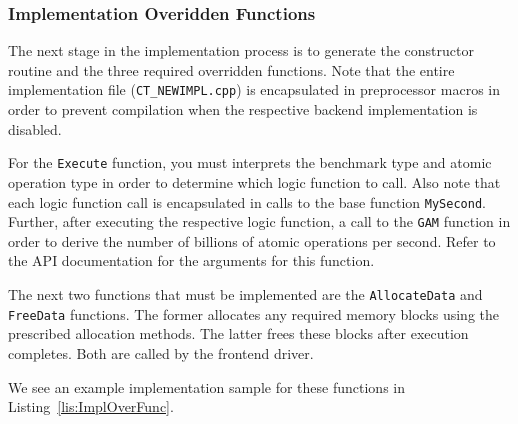 \documentclass{article}
\begin{document}
\clearpage
\subsubsection{Implementation Overidden Functions}

The next stage in the implementation process is to generate the constructor routine 
and the three required overridden functions.  Note that the entire implementation 
file (\texttt{CT\_NEWIMPL.cpp}) is encapsulated in preprocessor macros in order to prevent 
compilation when the respective backend implementation is disabled.  

For the \texttt{Execute} function, you must interprets the benchmark type and atomic operation type 
in order to determine which logic function to call.  Also note that each logic function call is encapsulated 
in calls to the base function \texttt{MySecond}.  Further, after executing the respective logic function, a call 
to the \texttt{GAM} function in order to derive the number of billions of atomic operations per second.  Refer to 
the API documentation for the arguments for this function.  

The next two functions that must be implemented are the \texttt{AllocateData} and \texttt{FreeData} functions.  
The former allocates any required memory blocks using the prescribed allocation methods.  The latter frees these 
blocks after execution completes.  Both are called by the frontend driver.  

We see an example implementation sample for these functions in Listing~\ref{lis:ImplOverFunc}.  
\end{document}
